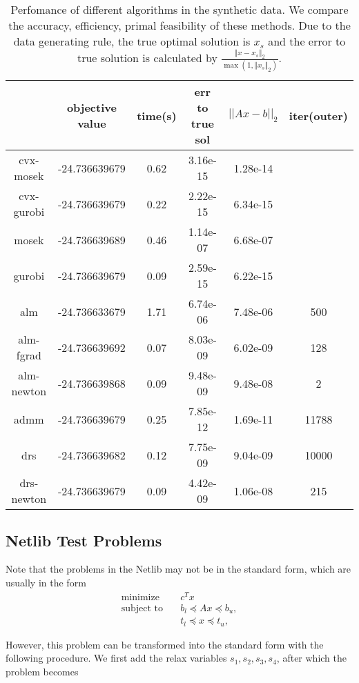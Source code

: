 \documentclass[a4paper]{article}
\begin{document}
\begin{table}[h]
	\centering
	\begin{tabular}{cccccc}
		\hline
		                 &  objective value& time(s) &   err to true sol & $||Ax-b||_2$ &iter(outer) \\ \hline
		cvx-mosek& -24.736639679&0.62&3.16e-15&1.28e-14&     \\
		cvx-gurobi&-24.736639679&0.22&2.22e-15&6.34e-15 &    \\
		mosek       &-24.736639689 & 0.46& 1.14e-07&6.68e-07 &\\
		gurobi       &-24.736639679 &  0.09&2.59e-15&6.22e-15& \\
		\hline 
		alm            &-24.736633679 & 1.71& 6.74e-06&7.48e-06&500\\
		alm-fgrad  &-24.736639692 &  0.07&8.03e-09&6.02e-09&128\\
	 alm-newton  &-24.736639868&  0.09&9.48e-09&9.48e-08&2\\
		admm        &-24.736639679&  0.25& 7.85e-12&1.69e-11&11788\\
		drs             &-24.736639682&  0.12&7.75e-09&9.04e-09&10000\\
		drs-newton&-24.736639679&  0.09&4.42e-09&1.06e-08&215\\
		\hline
	\end{tabular}
	\caption{Perfomance of different algorithms in the synthetic data. We compare the accuracy, efficiency, primal feasibility of these methods.  Due to the data generating rule, the true optimal solution is $x_s$ and the error to true solution is calculated by $\frac{\Vert x-x_s\Vert_2}{\max(1,\Vert x_s\Vert_2)}$. }
	\label{tab:results}
\end{table}


\subsection{Netlib Test Problems}
Note that the problems in the Netlib may not be in the standard form, which are usually in the form
\begin{equation}\label{netlib}
\begin{split}\textrm{minimize} \quad  & c^Tx\\
\textrm{subject to} \quad & b_l \preceq Ax \preceq b_u, \\
& t_l \preceq x \preceq t_u,
\end{split}
\end{equation}

However, this problem can be transformed into the standard form with the following procedure. We first add the relax variables $s_1, s_2, s_3, s_4$, after which the problem becomes
\end{document}
